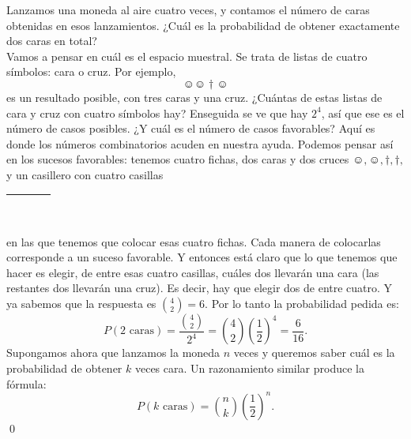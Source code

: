     \begin{Ejemplo}
    \label{cap03:ejem:probabilidadLanzamientoMonedas}
    Lanzamos una moneda al aire cuatro veces, y contamos el número de caras obtenidas en esos lanzamientos. ¿Cuál es la probabilidad de obtener exactamente dos caras en total?\\
    Vamos a pensar en cuál es el espacio muestral. Se trata de listas de cuatro símbolos: cara o cruz. Por ejemplo,
    \[\smiley\smiley\dagger\smiley\]
    es un resultado posible, con tres caras y una cruz. ¿Cuántas de estas listas de cara y cruz con cuatro símbolos hay? Enseguida se ve que hay $2^4$, así que ese es el número de casos posibles. ¿Y cuál es el número de casos favorables? Aquí es donde los números combinatorios acuden en nuestra ayuda. Podemos pensar así en los sucesos favorables: tenemos cuatro fichas, dos caras y dos cruces $\smiley,\smiley,\dagger,\dagger,$ y un casillero con cuatro casillas
    \begin{center}
    \begin{tabular}{|c|c|c|c|}
    \hline
     \rule{0cm}{0.5cm}\rule{1cm}{0cm}&\rule{1cm}{0cm}&\rule{1cm}{0cm} &\rule{1cm}{0cm}\\
     \hline
     \end{tabular}
     \end{center}
     en las que tenemos que colocar esas cuatro fichas. Cada manera de colocarlas corresponde a un suceso favorable. Y entonces está claro que lo que tenemos que hacer es elegir, de entre esas cuatro casillas, cuáles dos llevarán una cara (las restantes dos llevarán una cruz). Es decir, hay que elegir dos de entre cuatro. Y ya sabemos que la respuesta es $\binom{4}{2}=6$. Por lo tanto la probabilidad pedida es:
     \[P(2 \mbox{ caras} )=\dfrac{\binom{4}{2}}{2^4}=\binom{4}{2}\left(\dfrac{1}{2}\right)^4=\dfrac{6}{16}.\]
     Supongamos ahora que lanzamos la moneda $n$ veces y queremos saber cuál es la probabilidad de obtener $k$ veces cara. Un razonamiento similar produce la fórmula:
    \[P(k \mbox{ caras})=\binom{n}{k}\left(\dfrac{1}{2}\right)^n.\]
    \qed
    \end{Ejemplo}

